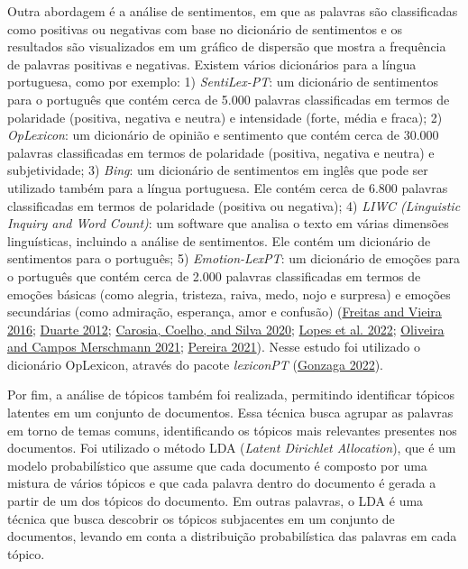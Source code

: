 \documentclass[preprint, 3p,
authoryear]{elsarticle} %
\begin{document}
Outra abordagem é a análise de sentimentos, em que as palavras são
classificadas como positivas ou negativas com base no dicionário de
sentimentos e os resultados são visualizados em um gráfico de dispersão
que mostra a frequência de palavras positivas e negativas. Existem
vários dicionários para a língua portuguesa, como por exemplo: 1)
\emph{SentiLex-PT}: um dicionário de sentimentos para o português que
contém cerca de 5.000 palavras classificadas em termos de polaridade
(positiva, negativa e neutra) e intensidade (forte, média e fraca); 2)
\emph{OpLexicon}: um dicionário de opinião e sentimento que contém cerca
de 30.000 palavras classificadas em termos de polaridade (positiva,
negativa e neutra) e subjetividade; 3) \emph{Bing}: um dicionário de
sentimentos em inglês que pode ser utilizado também para a língua
portuguesa. Ele contém cerca de 6.800 palavras classificadas em termos
de polaridade (positiva ou negativa); 4) \emph{LIWC (Linguistic Inquiry
and Word Count)}: um software que analisa o texto em várias dimensões
linguísticas, incluindo a análise de sentimentos. Ele contém um
dicionário de sentimentos para o português; 5) \emph{Emotion-LexPT}: um
dicionário de emoções para o português que contém cerca de 2.000
palavras classificadas em termos de emoções básicas (como alegria,
tristeza, raiva, medo, nojo e surpresa) e emoções secundárias (como
admiração, esperança, amor e confusão)
(\protect\hyperlink{ref-vieira2015}{Freitas and Vieira 2016};
\protect\hyperlink{ref-Duarte2012}{Duarte 2012};
\protect\hyperlink{ref-Carosia2020}{Carosia, Coelho, and Silva 2020};
\protect\hyperlink{ref-Lopes2022}{Lopes et al. 2022};
\protect\hyperlink{ref-nunes2021}{Oliveira and Campos Merschmann 2021};
\protect\hyperlink{ref-Pereira2021}{Pereira 2021}). Nesse estudo foi
utilizado o dicionário OpLexicon, através do pacote \emph{lexiconPT}
(\protect\hyperlink{ref-lexiconPT}{Gonzaga 2022}).

Por fim, a análise de tópicos também foi realizada, permitindo
identificar tópicos latentes em um conjunto de documentos. Essa técnica
busca agrupar as palavras em torno de temas comuns, identificando os
tópicos mais relevantes presentes nos documentos. Foi utilizado o método
LDA (\emph{Latent Dirichlet Allocation}), que é um modelo probabilístico
que assume que cada documento é composto por uma mistura de vários
tópicos e que cada palavra dentro do documento é gerada a partir de um
dos tópicos do documento. Em outras palavras, o LDA é uma técnica que
busca descobrir os tópicos subjacentes em um conjunto de documentos,
levando em conta a distribuição probabilística das palavras em cada
tópico.
\end{document}
